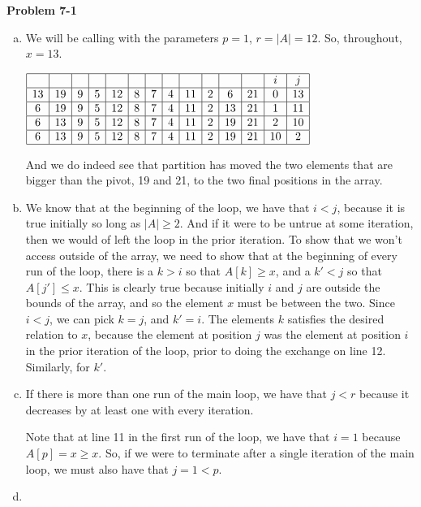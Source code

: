 \documentclass{article}
\begin{document}
\noindent\textbf{Problem 7-1}\\
\begin{enumerate}[a.]
\item
We will be calling with the parameters $p=1$, $r=|A|=12$. So, throughout, $x=13$.
 
$
\begin{array}{|c|c|c|c|c|c|c|c|c|c|c|c|c|c|c|}
\hline
&&&&&&&&&&&&i&j\\
\hline
13&19&9&5&12&8&7&4&11&2&6&21&0&13\\
\hline
6&19&9&5&12&8&7&4&11&2&13&21&1&11\\
\hline
6&13&9&5&12&8&7&4&11&2&19&21&2&10\\
\hline
6&13&9&5&12&8&7&4&11&2&19&21&10&2\\
\hline
\end{array}
$

And we do indeed see that partition has moved the two elements that are bigger than the pivot, 19 and 21, to the two final positions in the array.

\item
We know that at the beginning of the loop, we have that $i<j$, because it is true initially so long as $|A|\ge 2$. And if it were to be untrue at some iteration, then we would of left the loop in the prior iteration. To show that we won't access outside of the array, we need to show that at the beginning of every run of the loop, there is a $k>i$ so that $A[k]\ge x$, and a $k'<j$ so that $A[j']\le x$. This is clearly true because initially $i$ and $j$ are outside the bounds of the array, and so the element $x$ must be between the two. Since $i<j$, we can pick $k=j$, and $k' =i$. The elements $k$ satisfies the desired relation to $x$, because the element at position $j$ was the element at position $i$ in the prior iteration of the loop, prior to doing the exchange on line 12. Similarly, for $k'$.

\item

If there is more than one run of the main loop, we have that $j<r$ because it decreases by at least one with every iteration.

Note that at line 11 in the first run of the loop, we have that $i=1$ because $A[p] =x \ge x$. So, if we were to terminate after a single iteration of the main loop, we must also have that $j=1 <p$.

\item


\end{enumerate}
\end{document}
